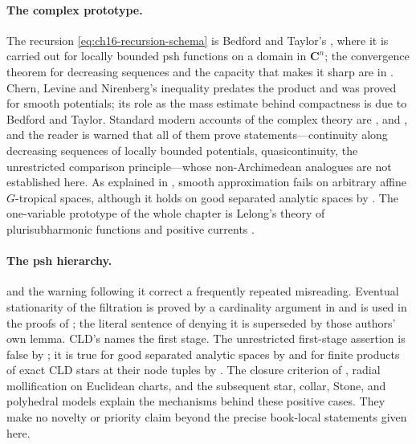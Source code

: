 \paragraph{The complex prototype.}
The recursion \eqref{eq:ch16-recursion-schema} is Bedford and Taylor's
\cite{BT76,BT82}, where it is carried out for locally bounded psh functions
on a domain in $\mathbf C^n$; the convergence theorem for decreasing
sequences and the capacity that makes it sharp are in \cite{BT82,BT87}.
Chern, Levine and Nirenberg's inequality \cite{CLN69} predates the product
and was proved for smooth potentials; its role as the mass estimate behind
compactness is due to Bedford and Taylor.  Standard modern accounts of the
complex theory are \cite[Chapter~3]{Kl91}, \cite[Chapter~III]{DemBook} and
\cite[Chapters~3 and~4]{GZ17}, and the reader is warned that all of them
prove statements---continuity along decreasing sequences of locally bounded
potentials, quasicontinuity, the unrestricted comparison principle---whose
non-Archimedean analogues are not established here.  As explained in
, smooth approximation fails on arbitrary
affine $G$-tropical spaces, although it holds on good separated analytic
spaces by .  The one-variable
prototype of the whole chapter is Lelong's theory of
plurisubharmonic functions and positive currents \cite{Lel68}.

\paragraph{The psh hierarchy.}
 and the warning following it correct a
frequently repeated misreading.  Eventual stationarity of the filtration is
proved by a cardinality argument in \cite[Lemma~8.1.4]{CLD25} and is used in
the proofs of \cite[Propositions~8.1.5, 8.1.11 and 8.2.1]{CLD25}; the
literal sentence of \cite[Remark~8.1.6]{CLD25} denying it is superseded by
those authors' own lemma.  CLD's
\cite[Definition~8.1.13]{CLD25} names the first stage.  The unrestricted
first-stage assertion is false by
; it is true for good separated
analytic spaces by  and for
finite products of exact CLD stars at their node tuples by
.  The closure criterion of
, radial mollification on Euclidean charts,
and the subsequent star, collar, Stone, and polyhedral models explain the
mechanisms behind these positive cases.  They make no novelty or priority
claim beyond the precise book-local statements given here.

